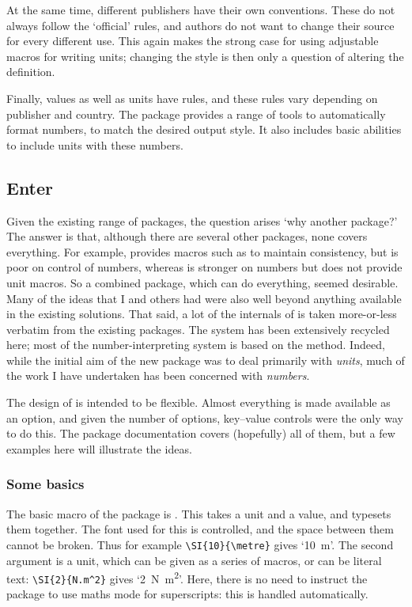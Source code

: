\begin{bibunit}
At the same time, different publishers have their own conventions.
These do not always follow the `official' rules, and authors
do not want to change their source for every different use.
This again makes the strong case for using adjustable macros
for writing units; changing the style is then only a question
of altering the definition.

Finally, values as well as units have rules, and these rules
vary depending on publisher and country.  The 
package \cite{Harders2008} provides a range of tools to
automatically format numbers, to match the desired output
style.  It also includes basic abilities to include units with
these numbers.

\subsection{Enter }

Given the existing range of packages, the question arises `why
another package?'  The answer is that, although there are
several other packages, none covers everything. For example,
 provides macros such as  to maintain
consistency, but is poor on control of numbers, whereas
 is stronger on numbers but does not provide unit
macros.  So a combined package, which can do everything, seemed
desirable.  Many of the ideas that I and others had were also
well beyond anything available in the existing solutions.  That
said, a lot of the internals of  is taken
more-or-less verbatim from the existing packages.  The
 system has been extensively recycled here; most
of the number-interpreting system is based on the
 method.  Indeed, while the initial aim of the
new package was to deal primarily with \emph{units}, much of
the work I have undertaken has been concerned with
\emph{numbers}.

The design of  is intended to be flexible.  Almost
everything is made available as an option, and given the number
of options, key--value controls were the only way to do this.
The package documentation covers (hopefully) all of them, but a
few examples here will illustrate the ideas.

\subsubsection{Some basics}

The basic macro of the package is .  This takes a unit
and a value, and typesets them together.  The font used for
this is controlled, and the space between them cannot be
broken.  Thus for example \verb|\SI{10}{\metre}| gives
`\SI{10}{\metre}'.  The second argument is a unit, which can
be given as a series of macros, or can be literal text:
\verb|\SI{2}{N.m^2}| gives `\SI{2}{N.m^2}'.  Here, there is
no need to instruct the package to use maths mode for
superscripts: this is handled automatically.


\end{bibunit}
